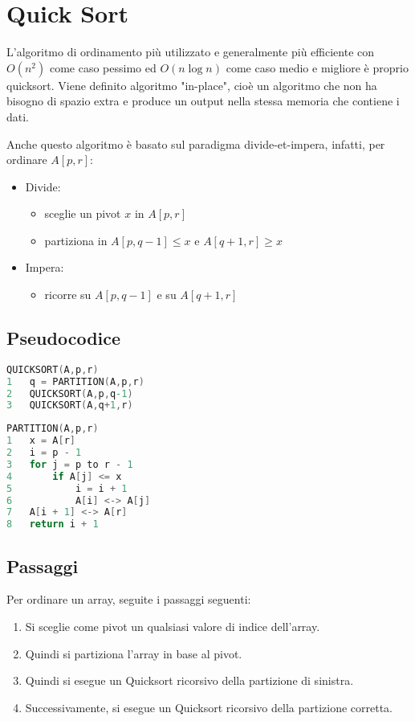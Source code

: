 \section{Quick Sort}
L'algoritmo di ordinamento più utilizzato e generalmente più efficiente con $O(n^2)$ come caso pessimo ed $O(n\log n)$ come caso medio e migliore è proprio quicksort.
Viene definito algoritmo "in-place", cioè un algoritmo che non ha bisogno di spazio extra e produce un output nella stessa memoria che contiene i dati.

Anche questo algoritmo è basato sul paradigma divide-et-impera, infatti, per ordinare $A[p, r]$:
\begin{itemize}
    \item Divide:
    \begin{itemize}
        \item sceglie un pivot $x$ in $A[p, r]$
        \item partiziona in $A[p, q-1] \leq x$ e $A[q+1, r] \geq x$
    \end{itemize}
    \item Impera:
    \begin{itemize}
        \item ricorre su $A[p, q-1]$ e su $A[q+1, r]$
    \end{itemize}
\end{itemize}

\subsection{Pseudocodice}
\begin{mdframed}
\begin{lstlisting}[language=C]
QUICKSORT(A,p,r)
1   q = PARTITION(A,p,r)
2   QUICKSORT(A,p,q-1)
3   QUICKSORT(A,q+1,r)
\end{lstlisting}
\end{mdframed}

\begin{mdframed}
\begin{lstlisting}[language=C]
PARTITION(A,p,r)
1   x = A[r]
2   i = p - 1
3   for j = p to r - 1
4       if A[j] <= x
5           i = i + 1
6           A[i] <-> A[j]
7   A[i + 1] <-> A[r]
8   return i + 1
\end{lstlisting}
\end{mdframed}

\subsection{Passaggi}
Per ordinare un array, seguite i passaggi seguenti:
\begin{enumerate}
    \item Si sceglie come pivot un qualsiasi valore di indice dell'array.
    \item Quindi si partiziona l'array in base al pivot.
    \item Quindi si esegue un Quicksort ricorsivo della partizione di sinistra.
    \item Successivamente, si esegue un Quicksort ricorsivo della partizione corretta.
\end{enumerate}

